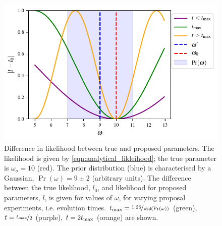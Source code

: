 \begin{figure}[t]
\begin{center}
    \includegraphics{theoretical_study/figures/likelihood_v_prior.pdf}
\end{center}
\caption[Difference in likelihood between true and proposed parameters]{
    Difference in \gls{likelihood} between true and proposed parameters. 
    The likelihood is given by \cref{eqn:analytical_likleihood}; 
        the true parameter is $\omega_o=10$ (red).
    The prior distribution (blue) is characterised by a Gaussian,
    $\Pr(\omega) = 9 \pm 2$ (arbitrary units).
    The difference between the true likelihood, $l_0$, and likelihood for proposed parameters, $l$, 
        is given for values of $\omega$, for varying proposal experiments, i.e. evolution times. 
    $t_{\rm{max}} = \nicefrac{1.26}{\texttt{std}(\Pr(\omega))}$ (green), 
    $t = \nicefrac{t_{\rm{max}}}{2}$ (purple), 
    $t = 2t_{\rm{max}}$ (orange) are shown.
}
\label{fig:likelihood_v_prior}
\end{figure}

